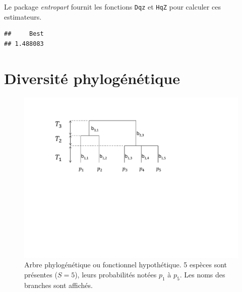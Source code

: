 \documentclass[
  11pt,
  french,
  a4paper,
  extrafontsizes,onecolumn,openright
  ]{memoir}
\newenvironment{Shaded}{\begin{snugshade}}{\end{snugshade}}
\newcommand{\CommentTok}[1]{\textcolor[rgb]{0.56,0.35,0.01}{\textit{#1}}}
\newcommand{\DataTypeTok}[1]{\textcolor[rgb]{0.13,0.29,0.53}{#1}}
\newcommand{\DecValTok}[1]{\textcolor[rgb]{0.00,0.00,0.81}{#1}}
\newcommand{\KeywordTok}[1]{\textcolor[rgb]{0.13,0.29,0.53}{\textbf{#1}}}
\newcommand{\NormalTok}[1]{#1}
\newcommand{\OperatorTok}[1]{\textcolor[rgb]{0.81,0.36,0.00}{\textbf{#1}}}
\newcommand{\StringTok}[1]{\textcolor[rgb]{0.31,0.60,0.02}{#1}}
\begin{document}
Le package \emph{entropart} fournit les fonctions \texttt{Dqz} et \texttt{HqZ} pour calculer ces estimateurs.

\scriptsize

\begin{Shaded}
\end{Shaded}

\begin{verbatim}
##     Best 
## 1.488083
\end{verbatim}

\normalsize

\hypertarget{diversituxe9-phyloguxe9nuxe9tique}{%
\section{Diversité phylogénétique}\label{diversituxe9-phyloguxe9nuxe9tique}}



\scriptsize

\begin{figure}

{\centering \includegraphics[width=0.8\linewidth]{images/ArbreA} 

}

\caption{Arbre phylogénétique ou fonctionnel hypothétique. 5 espèces sont présentes (\(S=5\)), leurs probabilités notées \(p_1\) à \(p_5\). Les noms des branches sont affichés.}\label{fig:ArbreA6}
\end{figure}
\end{document}
